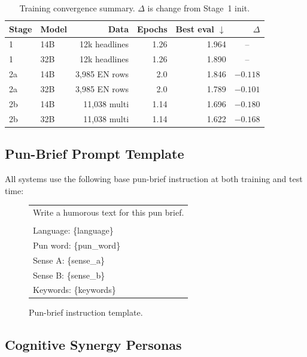 \documentclass[]{ceurart}
\begin{document}
\begin{table}[h]
  \small
  \centering
  \begin{tabular}{llrrrr}
    \toprule
    Stage & Model & Data & Epochs & Best eval $\downarrow$ & $\Delta$ \\
    \midrule
    1  & 14B & 12k headlines  & 1.26 & 1.964 & \multicolumn{1}{c}{--} \\
    1  & 32B & 12k headlines  & 1.26 & 1.890 & \multicolumn{1}{c}{--} \\
    2a & 14B & 3,985 EN rows  & 2.0  & 1.846 & $-0.118$ \\
    2a & 32B & 3,985 EN rows  & 2.0  & 1.789 & $-0.101$ \\
    2b & 14B & 11,038 multi   & 1.14 & 1.696 & $-0.180$ \\
    2b & 32B & 11,038 multi   & 1.14 & 1.622 & $-0.168$ \\
    \bottomrule
  \end{tabular}
  \caption{Training convergence summary. $\Delta$ is change from Stage~1 init.}
\end{table}

\subsection{Pun-Brief Prompt Template}
\label{sec:app-prompts}

All systems use the following base pun-brief instruction at both training and
test time:

\begin{figure}[h]
  \centering
  \ttfamily
  \begin{tabular}{l}
    Write a humorous text for this pun brief. \\
    \\
    Language: \{language\} \\
    Pun word: \{pun\_word\} \\
    Sense A: \{sense\_a\} \\
    Sense B: \{sense\_b\} \\
    Keywords: \{keywords\} 
  \end{tabular}
  \caption{\normalfont Pun-brief instruction template.}
\end{figure}

\subsection{Cognitive Synergy Personas}
\label{sec:app-personas}
\end{document}
